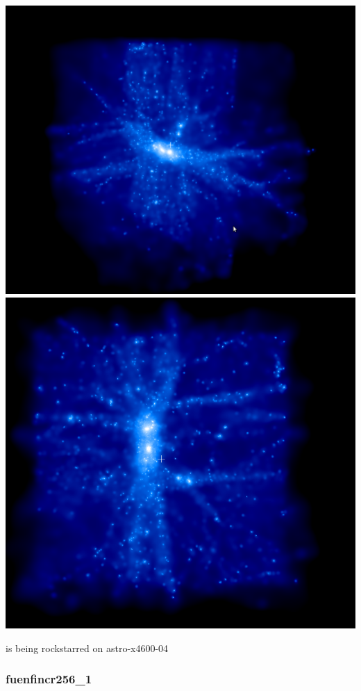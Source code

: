 \documentclass[a4paper,11pt,fleqn,oneside]{book}
\begin{document}
\includegraphics[scale=0.2]{drkltest+3c+sl50_1/1.png} 
\includegraphics[scale=0.2]{drkltest+3c+sl50_1/2.png}

is being rockstarred on astro-x4600-04 

\newpage
\subsubsection{fuenfincr256\_1}
\end{document}

